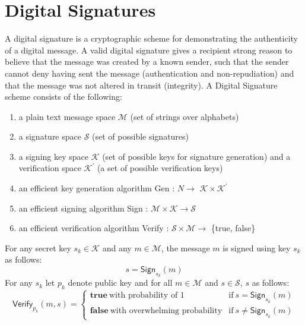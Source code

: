 \section{Digital Signatures}
	\label{sec:digital-signature}
	A digital signature is a cryptographic scheme for demonstrating the authenticity of a digital message. 
	A valid digital signature gives a recipient strong reason to believe that the message was created by a known sender, such that the sender cannot deny having sent the message (authentication and non-repudiation) and that the message was not altered in transit (integrity).
	A Digital Signature scheme consists of the following:
	\begin{enumerate}
		\item a plain text message space $\mathcal{M}$ (set of strings over alphabets)
		\item a signature space $\mathcal{S}$ (set of possible signatures)
		\item a signing key space $\mathcal{K}$ (set of possible keys for signature generation) and a verification space $\mathcal{K^{'}}$ (a set of possible verification keys)
		\item an efficient key generation algorithm \textsf{Gen} : $N \rightarrow$ $\mathcal{K} \times \mathcal{K^{'}} $ 
		\item an efficient signing algorithm \textsf{Sign} : $ \mathcal{M} \times \mathcal{K} \rightarrow \mathcal{S}$
		\item an efficient verification algorithm \textsf{Verify} : $\mathcal{S} \times \mathcal{M} \rightarrow$ \{true, false\} 
	\end{enumerate}
	For any secret key $s_{k} \in \mathcal{K}$ and any $m \in \mathcal{M}$,	the message $m$ is signed using key $s_{k}$ as follows:
		\begin{equation}
			s = \textsf{Sign}_{s_{k}}(m)
			\label{eq:signature}
		\end{equation}
	For any $s_{k}$ let $p_{k}$ denote public key and for all $m \in \mathcal{M}$ and $s \in \mathcal{S}$, $s$ as follows:
	\begin{equation}
		\textsf{Verify}_{p_{k}}(m,s) = 
		\begin{cases}
		 \textbf{true}\ \mbox{with probability of 1} & \mbox{if}\ s = \textsf{Sign}_{s_{k}}(m)\\
		 \textbf{false}\ \mbox{with overwhelming probability} & \mbox{if}\ s \neq \textsf{Sign}_{s_{k}}(m)
		\end{cases}
		\label{eq:verification}
	\end{equation}
